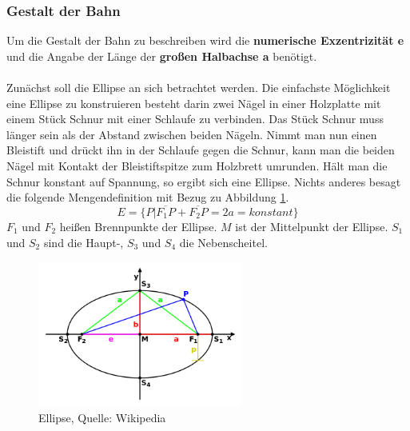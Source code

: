 \subsubsection*{Gestalt der Bahn}
Um die Gestalt der Bahn zu beschreiben wird die \textbf{numerische Exzentrizität e} und die Angabe der Länge der \textbf{großen Halbachse a} benötigt.
\\\\Zunächst soll die Ellipse an sich betrachtet werden. Die einfachste Möglichkeit eine Ellipse zu konstruieren besteht darin zwei Nägel in einer Holzplatte mit einem Stück Schnur mit einer Schlaufe zu verbinden. Das Stück Schnur muss länger sein als der Abstand zwischen beiden Nägeln. Nimmt man nun einen Bleistift und drückt ihn in der Schlaufe gegen die Schnur, kann man die beiden Nägel mit Kontakt der Bleistiftspitze zum Holzbrett umrunden. Hält man die Schnur konstant auf Spannung, so ergibt sich eine Ellipse. Nichts anderes besagt die folgende Mengendefinition mit Bezug zu Abbildung \ref{fig:ellipse}. 
\begin{equation}
	E = \{P | \overline{F_{1}P} + \overline{F_{2}P} = 2a = konstant\}
\end{equation}
\ensuremath{F_{1}} und \ensuremath{F_{2}} heißen Brennpunkte der Ellipse. \ensuremath{M} ist der Mittelpunkt der Ellipse. \ensuremath{S_{1}} und \ensuremath{S_{2}} sind die Haupt-, \ensuremath{S_{3}} und \ensuremath{S_{4}} die Nebenscheitel.      
\begin{figure}[!htbp]                                                                       %
	\centering                                                                            	%
	\includegraphics[width=0.6\textwidth]{./images/ellipse.png}                             %
	\caption[Ellipse]{Ellipse, Quelle: Wikipedia}                                           %
	\label{fig:ellipse}                                                                     %
\end{figure}                                                                              	%
